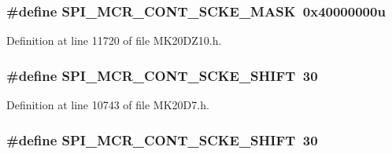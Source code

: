 \subsubsection[{\texorpdfstring{S\+P\+I\+\_\+\+M\+C\+R\+\_\+\+C\+O\+N\+T\+\_\+\+S\+C\+K\+E\+\_\+\+M\+A\+SK}{SPI_MCR_CONT_SCKE_MASK}}]{\setlength{\rightskip}{0pt plus 5cm}\#define S\+P\+I\+\_\+\+M\+C\+R\+\_\+\+C\+O\+N\+T\+\_\+\+S\+C\+K\+E\+\_\+\+M\+A\+SK~0x40000000u}\hypertarget{group___s_p_i___register___masks_gad40a2cace787fe5eaaf74379ffb7cfc2}{}\label{group___s_p_i___register___masks_gad40a2cace787fe5eaaf74379ffb7cfc2}


Definition at line 11720 of file M\+K20\+D\+Z10.\+h.

\subsubsection[{\texorpdfstring{S\+P\+I\+\_\+\+M\+C\+R\+\_\+\+C\+O\+N\+T\+\_\+\+S\+C\+K\+E\+\_\+\+S\+H\+I\+FT}{SPI_MCR_CONT_SCKE_SHIFT}}]{\setlength{\rightskip}{0pt plus 5cm}\#define S\+P\+I\+\_\+\+M\+C\+R\+\_\+\+C\+O\+N\+T\+\_\+\+S\+C\+K\+E\+\_\+\+S\+H\+I\+FT~30}\hypertarget{group___s_p_i___register___masks_ga57c862186e43a26823716267bfadd92f}{}\label{group___s_p_i___register___masks_ga57c862186e43a26823716267bfadd92f}


Definition at line 10743 of file M\+K20\+D7.\+h.

\subsubsection[{\texorpdfstring{S\+P\+I\+\_\+\+M\+C\+R\+\_\+\+C\+O\+N\+T\+\_\+\+S\+C\+K\+E\+\_\+\+S\+H\+I\+FT}{SPI_MCR_CONT_SCKE_SHIFT}}]{\setlength{\rightskip}{0pt plus 5cm}\#define S\+P\+I\+\_\+\+M\+C\+R\+\_\+\+C\+O\+N\+T\+\_\+\+S\+C\+K\+E\+\_\+\+S\+H\+I\+FT~30}\hypertarget{group___s_p_i___register___masks_ga57c862186e43a26823716267bfadd92f}{}\label{group___s_p_i___register___masks_ga57c862186e43a26823716267bfadd92f}


